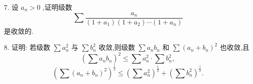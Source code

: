 7. 设 \({a}_{n} > 0\) ,证明级数
\[
\sum \frac{{a}_{n}}{\left( {1 + {a}_{1}}\right) \left( {1 + {a}_{2}}\right) \cdots \left( {1 + {a}_{n}}\right) }
\]
是收敛的.

8. 证明: 若级数 \(\sum {a}_{n}^{2}\) 与 \(\sum {b}_{n}^{2}\) 收敛,则级数 \(\sum {a}_{n}{b}_{n}\) 和 \(\sum {\left( {a}_{n} + {b}_{n}\right) }^{2}\) 也收敛,且
\[
{\left( \sum {a}_{n}{b}_{n}\right) }^{2} \leq  \sum {a}_{n}^{2} \cdot  \sum {b}_{n}^{2},
\]
\[
{\left( \sum {\left( {a}_{n} + {b}_{n}\right) }^{2}\right) }^{\frac{1}{2}} \leq  {\left( \sum {a}_{n}^{2}\right) }^{\frac{1}{2}} + {\left( \sum {b}_{n}^{2}\right) }^{\frac{1}{2}}.
\]
